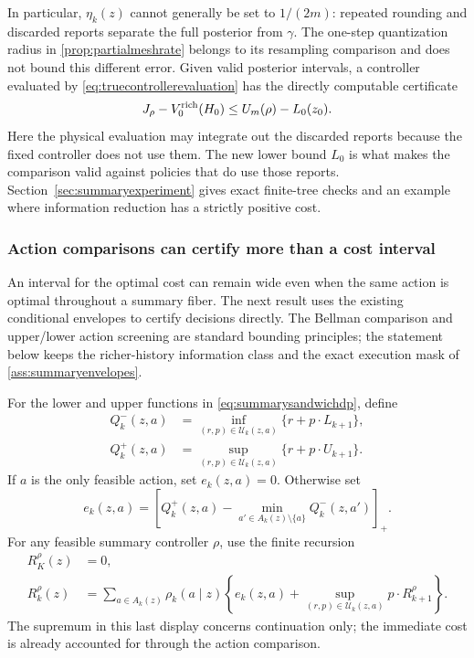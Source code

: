 In particular, $\eta_k(z)$ cannot generally be set to $1/(2m)$: repeated
rounding and discarded reports separate the full posterior from $\gamma$.
The one-step quantization radius in \cref{prop:partialmeshrate} belongs to
its resampling comparison and does not bound this different error.
Given valid posterior intervals, a controller evaluated by
\eqref{eq:truecontrollerevaluation} has the directly computable certificate
\[
 J_\rho-V_0^{\rm rich}(H_0)\le U_m(\rho)-L_0(z_0).
\]
Here the physical evaluation may integrate out the discarded reports because
the fixed controller does not use them. The new lower bound $L_0$ is what
makes the comparison valid against policies that do use those reports.
Section~\ref{sec:summaryexperiment} gives exact finite-tree checks and an
example where information reduction has a strictly positive cost.

\subsubsection*{Action comparisons can certify more than a cost interval}

An interval for the optimal cost can remain wide even when the same action
is optimal throughout a summary fiber. The next result uses the existing
conditional envelopes to certify decisions directly. The Bellman comparison
and upper/lower action screening are standard bounding principles; the
statement below keeps the richer-history information class and the exact
execution mask of \cref{ass:summaryenvelopes}.

For the lower and upper functions in \eqref{eq:summarysandwichdp}, define
\begin{align}\label{eq:summaryactionbounds}
 Q_k^-(z,a)&=\inf_{(r,p)\in\mathcal U_k(z,a)}
                     \{r+p\cdot L_{k+1}\},\nonumber\\
 Q_k^+(z,a)&=\sup_{(r,p)\in\mathcal U_k(z,a)}
                     \{r+p\cdot U_{k+1}\}.
\end{align}
If $a$ is the only feasible action, set $e_k(z,a)=0$. Otherwise set
\begin{equation}\label{eq:summaryactionexcess}
 e_k(z,a)=
 \left[Q_k^+(z,a)-\min_{a'\in A_k(z)\setminus\{a\}}Q_k^-(z,a')\right]_+.
\end{equation}
For any feasible summary controller $\rho$, use the finite recursion
\begin{align}\label{eq:summaryactionrecursion}
 R_K^\rho(z)&=0,\nonumber\\
 R_k^\rho(z)&=\sum_{a\in A_k(z)}\rho_k(a\mid z)
 \left\{e_k(z,a)+
       \sup_{(r,p)\in\mathcal U_k(z,a)}p\cdot R_{k+1}^\rho\right\}.
\end{align}
The supremum in this last display concerns continuation only; the immediate
cost is already accounted for through the action comparison.


